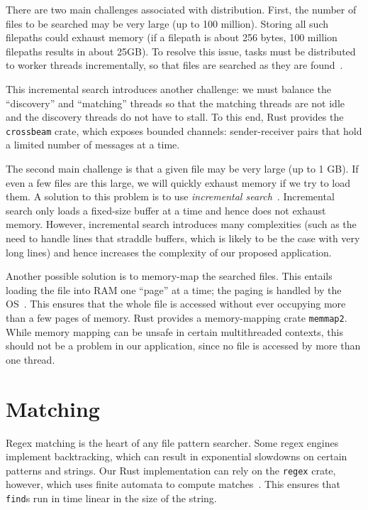 \documentclass[letterpaper,twocolumn,10pt]{article}
\begin{document}
There are two main challenges associated with distribution.
First, the number of files to be searched may be very large (up to 100 million).
Storing all such filepaths could exhaust memory (if a filepath is about 256 bytes, 100 million filepaths results in about 25GB).
To resolve this issue, tasks must be distributed to worker threads incrementally, so that files are searched as they are found~\cite{claude}.

This incremental search introduces another challenge: we must balance the ``discovery'' and ``matching'' threads so that the matching threads are not idle and the discovery threads do not have to stall.
To this end, Rust provides the \texttt{crossbeam} crate, which exposes bounded channels: sender-receiver pairs that hold a limited number of messages at a time.

The second main challenge is that a given file may be very large (up to 1 GB).
If even a few files are this large, we will quickly exhaust memory if we try to load them.
A solution to this problem is to use \emph{incremental search}~\cite{gallantRipgrepBlog}.
Incremental search only loads a fixed-size buffer at a time and hence does not exhaust memory.
However, incremental search introduces many complexities (such as the need to handle lines that straddle buffers, which is likely to be the case with very long lines) and hence increases the complexity of our proposed application.

Another possible solution is to memory-map the searched files.
This entails loading the file into RAM one ``page'' at a time; the paging is handled by the OS~\cite{memmap}.
This ensures that the whole file is accessed without ever occupying more than a few pages of memory.
Rust provides a memory-mapping crate \texttt{memmap2}.
While memory mapping can be unsafe in certain multithreaded contexts, this should not be a problem in our application, since no file is accessed by more than one thread.


\section{Matching}

Regex matching is the heart of any file pattern searcher.
Some regex engines implement backtracking, which can result in exponential slowdowns on certain patterns and strings.
Our Rust implementation can rely on the \texttt{regex} crate, however, which uses finite automata to compute matches~\cite{regex}.
This ensures that \texttt{find}s run in time linear in the size of the string.
\end{document}
